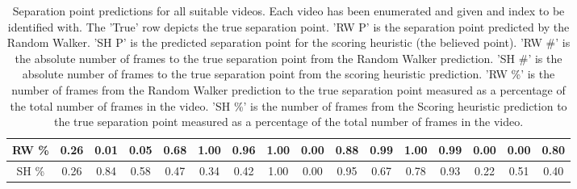 \begin{table}[H]
\begin{tabular}{|c|c|c|c|c|c|c|c|c|c|c|c|c|c|c|c|}
		RW \% & \cellcolor[HTML]{ECF4FF}0.26                                             & \cellcolor[HTML]{ECF4FF}0.01                                             & \cellcolor[HTML]{ECF4FF}0.05                                             & \cellcolor[HTML]{ECF4FF}0.68                                            & \cellcolor[HTML]{ECF4FF}1.00                                           & \cellcolor[HTML]{ECF4FF}0.96                                           & \cellcolor[HTML]{ECF4FF}1.00                                           & \cellcolor[HTML]{ECF4FF}0.00                                             & \cellcolor[HTML]{ECF4FF}0.88                                             & \cellcolor[HTML]{ECF4FF}0.99                                             & \cellcolor[HTML]{ECF4FF}1.00                                             & \cellcolor[HTML]{ECF4FF}0.99                                             & \cellcolor[HTML]{ECF4FF}0.00                                             & \cellcolor[HTML]{ECF4FF}0.00                                             & \cellcolor[HTML]{ECF4FF}0.80                                             \\ \hline
		SH \% & \cellcolor[HTML]{CBCEFB}0.26                                             & \cellcolor[HTML]{CBCEFB}0.84                                             & \cellcolor[HTML]{CBCEFB}0.58                                             & \cellcolor[HTML]{CBCEFB}0.47                                            & \cellcolor[HTML]{CBCEFB}0.34                                           & \cellcolor[HTML]{CBCEFB}0.42                                           & \cellcolor[HTML]{CBCEFB}1.00                                           & \cellcolor[HTML]{CBCEFB}0.00                                             & \cellcolor[HTML]{CBCEFB}0.95                                             & \cellcolor[HTML]{CBCEFB}0.67                                             & \cellcolor[HTML]{CBCEFB}0.78                                             & \cellcolor[HTML]{CBCEFB}0.93                                             & \cellcolor[HTML]{CBCEFB}0.22                                             & \cellcolor[HTML]{CBCEFB}0.51                                             & \cellcolor[HTML]{CBCEFB}0.40                                             \\ \hline
	\end{tabular}
	\caption{Separation point predictions for all suitable videos. Each video has been enumerated and given and index to be identified with. The 'True' row depicts the true separation point. 'RW P' is the separation point predicted by the Random Walker. 'SH P' is the predicted separation point for the scoring heuristic (the believed point). 'RW \#' is the absolute number of frames to the true separation point from the Random Walker prediction. 'SH \#' is the absolute number of frames to the true separation point from the scoring heuristic prediction. 'RW \%' is the number of frames from the Random Walker prediction to the true separation point measured as a percentage of the total number of frames in the video. 'SH \%' is the number of frames from the Scoring heuristic prediction to the true separation point measured as a percentage of the total number of frames in the video.}

\end{table}
